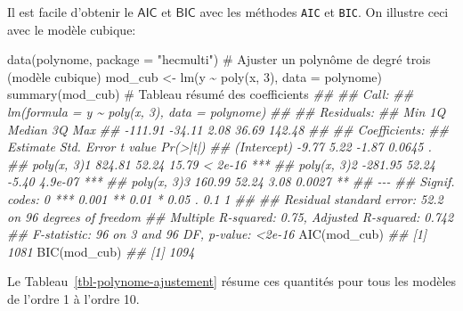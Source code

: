 \documentclass[
  11pt,
  letterpaper,
]{book}
\newenvironment{Shaded}{\begin{snugshade}}{\end{snugshade}}
\newcommand{\AttributeTok}[1]{\textcolor[rgb]{0.40,0.45,0.13}{#1}}
\newcommand{\CommentTok}[1]{\textcolor[rgb]{0.37,0.37,0.37}{#1}}
\newcommand{\DecValTok}[1]{\textcolor[rgb]{0.68,0.00,0.00}{#1}}
\newcommand{\DocumentationTok}[1]{\textcolor[rgb]{0.37,0.37,0.37}{\textit{#1}}}
\newcommand{\FunctionTok}[1]{\textcolor[rgb]{0.28,0.35,0.67}{#1}}
\newcommand{\NormalTok}[1]{\textcolor[rgb]{0.00,0.23,0.31}{#1}}
\newcommand{\OtherTok}[1]{\textcolor[rgb]{0.00,0.23,0.31}{#1}}
\newcommand{\SpecialCharTok}[1]{\textcolor[rgb]{0.37,0.37,0.37}{#1}}
\newcommand{\StringTok}[1]{\textcolor[rgb]{0.13,0.47,0.30}{#1}}
\theoremstyle{definition}
\theoremstyle{remark}
\begin{document}
Il est facile d'obtenir le \(\mathsf{AIC}\) et \(\mathsf{BIC}\) avec les
méthodes \texttt{AIC} et \texttt{BIC}. On illustre ceci avec le modèle
cubique:

\begin{Shaded}
\begin{Highlighting}[]
\FunctionTok{data}\NormalTok{(polynome, }\AttributeTok{package =} \StringTok{"hecmulti"}\NormalTok{)}
\CommentTok{\# Ajuster un polynôme de degré trois (modèle cubique)}
\NormalTok{mod\_cub }\OtherTok{\textless{}{-}} \FunctionTok{lm}\NormalTok{(y }\SpecialCharTok{\textasciitilde{}} \FunctionTok{poly}\NormalTok{(x, }\DecValTok{3}\NormalTok{),}
              \AttributeTok{data =}\NormalTok{ polynome)}
\FunctionTok{summary}\NormalTok{(mod\_cub) }\CommentTok{\# Tableau résumé des coefficients}
\DocumentationTok{\#\# }
\DocumentationTok{\#\# Call:}
\DocumentationTok{\#\# lm(formula = y \textasciitilde{} poly(x, 3), data = polynome)}
\DocumentationTok{\#\# }
\DocumentationTok{\#\# Residuals:}
\DocumentationTok{\#\#     Min      1Q  Median      3Q     Max }
\DocumentationTok{\#\# {-}111.91  {-}34.11    2.08   36.69  142.48 }
\DocumentationTok{\#\# }
\DocumentationTok{\#\# Coefficients:}
\DocumentationTok{\#\#             Estimate Std. Error t value Pr(\textgreater{}|t|)    }
\DocumentationTok{\#\# (Intercept)    {-}9.77       5.22   {-}1.87   0.0645 .  }
\DocumentationTok{\#\# poly(x, 3)1   824.81      52.24   15.79  \textless{} 2e{-}16 ***}
\DocumentationTok{\#\# poly(x, 3)2  {-}281.95      52.24   {-}5.40  4.9e{-}07 ***}
\DocumentationTok{\#\# poly(x, 3)3   160.99      52.24    3.08   0.0027 ** }
\DocumentationTok{\#\# {-}{-}{-}}
\DocumentationTok{\#\# Signif. codes:  0 \textquotesingle{}***\textquotesingle{} 0.001 \textquotesingle{}**\textquotesingle{} 0.01 \textquotesingle{}*\textquotesingle{} 0.05 \textquotesingle{}.\textquotesingle{} 0.1 \textquotesingle{} \textquotesingle{} 1}
\DocumentationTok{\#\# }
\DocumentationTok{\#\# Residual standard error: 52.2 on 96 degrees of freedom}
\DocumentationTok{\#\# Multiple R{-}squared:  0.75,   Adjusted R{-}squared:  0.742 }
\DocumentationTok{\#\# F{-}statistic:   96 on 3 and 96 DF,  p{-}value: \textless{}2e{-}16}
\FunctionTok{AIC}\NormalTok{(mod\_cub)}
\DocumentationTok{\#\# [1] 1081}
\FunctionTok{BIC}\NormalTok{(mod\_cub)}
\DocumentationTok{\#\# [1] 1094}
\end{Highlighting}
\end{Shaded}

Le Tableau~\ref{tbl-polynome-ajustement} résume ces quantités pour tous
les modèles de l'ordre 1 à l'ordre 10.
\end{document}

